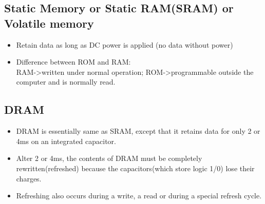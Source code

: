 \documentclass[12pt]{article}
\begin{document}
\subsection{Static Memory or Static RAM(SRAM) or Volatile memory}

\begin{itemize}
	\item Retain data as long as DC power is applied (no data without power)
	
	\item Difference between ROM and RAM:\\
	RAM->written under normal operation;
	ROM->programmable outside the computer and is normally read.
\end{itemize}

\subsection{DRAM}
\begin{itemize}
	\item DRAM is essentially same as SRAM, except that it retains data for only 2 or 4ms on an integrated capacitor.
	
	\item Alter 2 or 4ms, the contents of DRAM must be completely rewritten(refreshed) because the capacitors(which store logic 1/0) lose their charges.
	
	\item Refreshing also occurs during a write, a read or during a special refresh cycle.
\end{itemize}

\newpage


\end{document}
